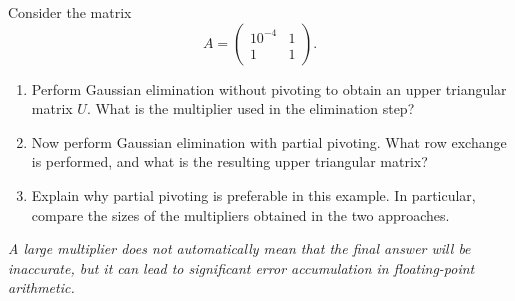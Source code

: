 \documentclass{ximera}
\begin{document}
\begin{exercise}
Consider the matrix
\[
A = \begin{pmatrix}
10^{-4} & 1\\
1 & 1
\end{pmatrix}.
\]

\begin{enumerate}
    \item Perform Gaussian elimination without pivoting to obtain an upper triangular matrix $U$. What is the multiplier used in the elimination step?

    \item Now perform Gaussian elimination with partial pivoting. What row exchange is performed, and what is the resulting upper triangular matrix?

    \item Explain why partial pivoting is preferable in this example. In particular, compare the sizes of the multipliers obtained in the two approaches.
\end{enumerate}

\textit{A large multiplier does not automatically mean that the final answer will be inaccurate, but it can lead to significant error accumulation in floating-point arithmetic.}

\end{exercise}
\end{document}
